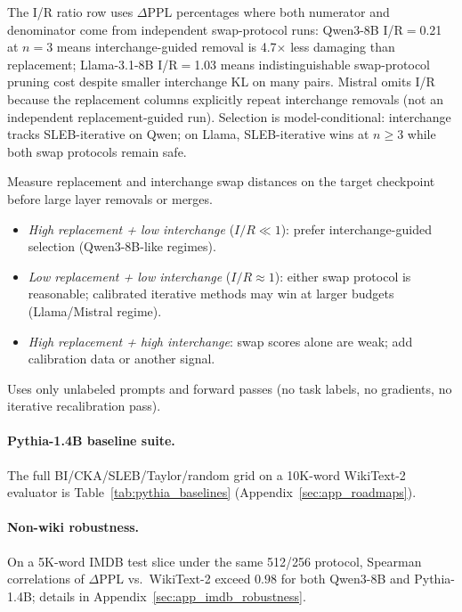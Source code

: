 \documentclass{article}
\begin{document}
The I/R ratio row uses $\Delta$PPL percentages where both numerator and denominator come from independent swap-protocol runs: Qwen3-8B I/R$=$0.21 at $n{=}3$ means interchange-guided removal is 4.7$\times$ less damaging than replacement; Llama-3.1-8B I/R$=$1.03 means indistinguishable swap-protocol pruning cost despite smaller interchange KL on many pairs. Mistral omits I/R because the replacement columns explicitly repeat interchange removals (not an independent replacement-guided run). Selection is model-conditional: interchange tracks SLEB-iterative on Qwen; on Llama, SLEB-iterative wins at $n{\geq}3$ while both swap protocols remain safe.

\vspace{4pt}
\begin{tcolorbox}[title={Decision rule},colback=gray!9,colframe=gray!55,boxrule=0.55pt]
Measure replacement and interchange swap distances on the target checkpoint before large layer removals or merges.
\begin{itemize}
    \item \emph{High replacement + low interchange} ($I/R \ll 1$): prefer interchange-guided selection (Qwen3-8B-like regimes).
    \item \emph{Low replacement + low interchange} ($I/R \approx 1$): either swap protocol is reasonable; calibrated iterative methods may win at larger budgets (Llama/Mistral regime).
    \item \emph{High replacement + high interchange}: swap scores alone are weak; add calibration data or another signal.
\end{itemize}
Uses only unlabeled prompts and forward passes (no task labels, no gradients, no iterative recalibration pass).
\end{tcolorbox}

\paragraph{Pythia-1.4B baseline suite.}
The full BI/CKA/SLEB/Taylor/random grid on a 10K-word WikiText-2 evaluator is Table~\ref{tab:pythia_baselines} (Appendix~\ref{sec:app_roadmaps}).

\paragraph{Non-wiki robustness.}
On a 5K-word IMDB test slice under the same 512/256 protocol, Spearman correlations of $\Delta$PPL vs.\ WikiText-2 exceed $0.98$ for both Qwen3-8B and Pythia-1.4B; details in Appendix~\ref{sec:app_imdb_robustness}.
\end{document}
